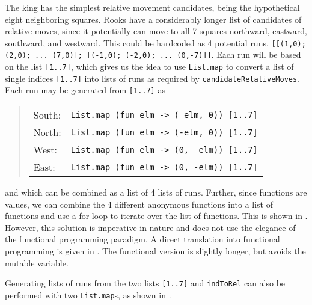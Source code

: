 \documentclass[fsharpNotes.tex]{subfiles}
\begin{document}
The king has the simplest relative movement candidates, being the hypothetical eight neighboring squares. Rooks have a considerably longer list of candidates of relative moves, since it potentially can move to all 7 squares northward, eastward, southward, and westward. This could be hardcoded as 4 potential runs, \lstinline{[[(1,0); (2,0); ... (7,0)]; [(-1,0); (-2,0); ... (0,-7)]]}. Each run will be based on the list \lstinline{[1..7]}, which gives us the idea to use \lstinline{List.map} to convert a list of single indices \lstinline{[1..7]} into lists of runs as required by \lstinline{candidateRelativeMoves}. Each run may be generated from \lstinline{[1..7]} as
\begin{quote}
  \begin{tabular}{ll}
    South:& \lstinline!List.map (fun elm -> ( elm, 0)) [1..7]! \\
    North:& \lstinline!List.map (fun elm -> (-elm, 0)) [1..7]!  \\
    West:& \lstinline!List.map (fun elm -> (0,  elm)) [1..7]! \\
    East:& \lstinline!List.map (fun elm -> (0, -elm)) [1..7]! 
  \end{tabular}
\end{quote}
and which can be combined as a list of 4 lists of runs. Further, since functions are values, we can combine the 4 different anonymous functions into a list of functions and use a for-loop to iterate over the list of functions. This is shown in .
%
%
However, this solution is imperative in nature and does not use the elegance of the functional programming paradigm. A direct translation into functional programming is given in .
%
%
The functional version is slightly longer, but avoids the mutable variable.

Generating lists of runs from the two lists \lstinline{[1..7]} and \lstinline{indToRel} can also be performed with two \lstinline{List.map}s, as shown in .
\end{document}
